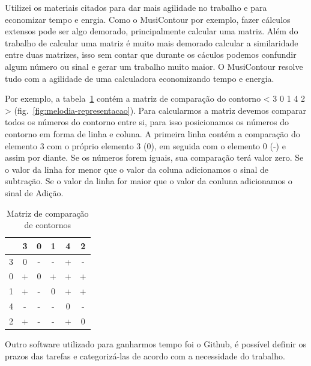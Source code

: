 \documentclass[11pt]{article}
\begin{document}
Utilizei os materiais citados para dar mais agilidade no trabalho e para
economizar tempo e enrgia.
Como o MusiContour por exemplo, fazer cálculos extensos pode ser algo
demorado, principalmente calcular uma matriz. Além do trabalho de
calcular uma matriz é muito mais demorado calcular a similaridade
entre duas matrizes, isso sem contar que durante os cáculos podemos
confundir algum número ou sinal e gerar um trabalho muito maior. O
MusiContour resolve tudo com a agilidade de uma calculadora
economizando tempo e energia.

Por exemplo, a tabela~\ref{tab:matriz-comparacao-contornos} contém a
matriz de comparação do contorno < 3 0 1 4 2 >
(fig.~\ref{fig:melodia-representacao}). Para calcularmos a matriz
devemos comparar todos os números do contorno entre si, para isso
posicionamos os números do contorno em forma de linha e coluna.
A primeira linha contém a comparação do elemento 3 com o próprio elemento 3 (0),
em seguida com o elemento 0 (-) e assim por diante. Se os números forem iguais,
sua comparação terá valor zero. Se o valor da linha for menor que o valor da
coluna adicionamos o sinal de subtração. Se o valor da linha for maior
que o valor da conluna adicionamos o sinal de Adição.

\begin{table}
  \centering
  \begin{tabular}{c|ccccc}
    &3&0&1&4&2\\
    \hline
    3&0&-&-&+&-\\
    0&+&0&+&+&+\\
    1&+&-&0&+&+\\
    4&-&-&-&0&-\\
    2&+&-&-&+&0\\
  \end{tabular}
  \caption{Matriz de comparação de contornos}
  \label{tab:matriz-comparacao-contornos}
\end{table}

Outro software utilizado para ganharmos tempo foi o Github, é possível definir os
prazos das tarefas e categorizá-las de acordo com a necessidade do trabalho.
\end{document}

